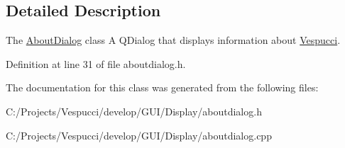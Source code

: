 \subsection{Detailed Description}
The \hyperlink{class_about_dialog}{About\+Dialog} class A Q\+Dialog that displays information about \hyperlink{namespace_vespucci}{Vespucci}. 

Definition at line 31 of file aboutdialog.\+h.



The documentation for this class was generated from the following files\+:\begin{DoxyCompactItemize}
\item 
C\+:/\+Projects/\+Vespucci/develop/\+G\+U\+I/\+Display/aboutdialog.\+h\item 
C\+:/\+Projects/\+Vespucci/develop/\+G\+U\+I/\+Display/aboutdialog.\+cpp\end{DoxyCompactItemize}
